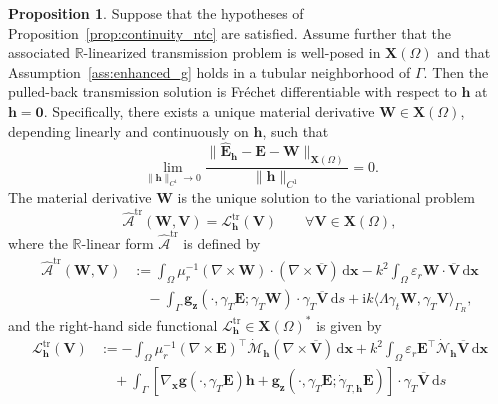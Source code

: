 \documentclass[12pt,reqno]{amsart}
\theoremstyle{definition}
\newtheorem{prop}[theo]{Proposition}
\numberwithin{equation}{section}
\begin{document}
\begin{prop}\label{prop:material_ntc}
Suppose that the hypotheses of Proposition~\ref{prop:continuity_ntc} are satisfied. Assume further that the associated $\mathbb{R}$-linearized transmission problem is well-posed in $\mathbf{X}(\Omega)$ and that Assumption~\ref{ass:enhanced_g} holds in a tubular neighborhood of $\Gamma$. Then the pulled-back transmission solution is Fr\'{e}chet differentiable with respect to $\mathbf{h}$ at $\mathbf{h} = \mathbf{0}$. Specifically, there exists a unique material derivative $\mathbf{W} \in \mathbf{X}(\Omega)$, depending linearly and continuously on $\mathbf{h}$, such that
\[
\lim_{\|\mathbf{h}\|_{C^1} \to 0} \frac{\|\hat{\mathbf{E}}_{\mathbf{h}} - \mathbf{E} - \mathbf{W}\|_{\mathbf{X}(\Omega)}}{\|\mathbf{h}\|_{C^1}} = 0.
\]
The material derivative $\mathbf{W}$ is the unique solution to the variational problem
\[
\widehat{\mathcal{A}}^{\mathrm{tr}}(\mathbf{W}, \mathbf{V}) = \mathcal{L}_{\mathbf{h}}^{\mathrm{tr}}(\mathbf{V}) \qquad \forall \mathbf{V} \in \mathbf{X}(\Omega),
\]
where the $\mathbb{R}$-linear form $\widehat{\mathcal{A}}^{\mathrm{tr}}$ is defined by
\begin{equation}
\begin{aligned}
\widehat{\mathcal{A}}^{\mathrm{tr}}(\mathbf{W}, \mathbf{V}) &:= \int_{\Omega} \mu_r^{-1} (\nabla \times \mathbf{W}) \cdot (\nabla \times \overline{\mathbf{V}}) \,\mathrm{d}\boldsymbol{x} - k^2 \int_{\Omega} \varepsilon_r \mathbf{W} \cdot \overline{\mathbf{V}} \,\mathrm{d}\boldsymbol{x} \\
&\quad - \int_{\Gamma} \mathbf{g}_{\boldsymbol{z}}(\cdot, \gamma_T \mathbf{E}; \gamma_T \mathbf{W}) \cdot \gamma_T \overline{\mathbf{V}} \,\mathrm{d}s + \mathrm{i}k \langle \Lambda \gamma_t \mathbf{W}, \gamma_T \mathbf{V} \rangle_{\Gamma_R},
\end{aligned}
\end{equation}
and the right-hand side functional $\mathcal{L}_{\mathbf{h}}^{\mathrm{tr}} \in \mathbf{X}(\Omega)^*$ is given by
\begin{equation}
\begin{aligned}
\mathcal{L}_{\mathbf{h}}^{\mathrm{tr}}(\mathbf{V}) &:= -\int_{\Omega} \mu_r^{-1} (\nabla \times \mathbf{E})^\top \dot{\mathcal{M}}_{\mathbf{h}} (\nabla \times \overline{\mathbf{V}}) \,\mathrm{d}\boldsymbol{x} + k^2 \int_{\Omega} \varepsilon_r \mathbf{E}^\top \dot{\mathcal{N}}_{\mathbf{h}} \overline{\mathbf{V}} \,\mathrm{d}\boldsymbol{x} \\
&\quad + \int_{\Gamma} \left[ \nabla_{\boldsymbol{x}} \mathbf{g}(\cdot, \gamma_T \mathbf{E}) \mathbf{h} + \mathbf{g}_{\boldsymbol{z}}(\cdot, \gamma_T \mathbf{E}; \dot{\gamma}_{T,\mathbf{h}} \mathbf{E}) \right] \cdot \gamma_T \overline{\mathbf{V}} \,\mathrm{d}s \\

\end{aligned}
\end{equation}
\end{prop}
\end{document}
